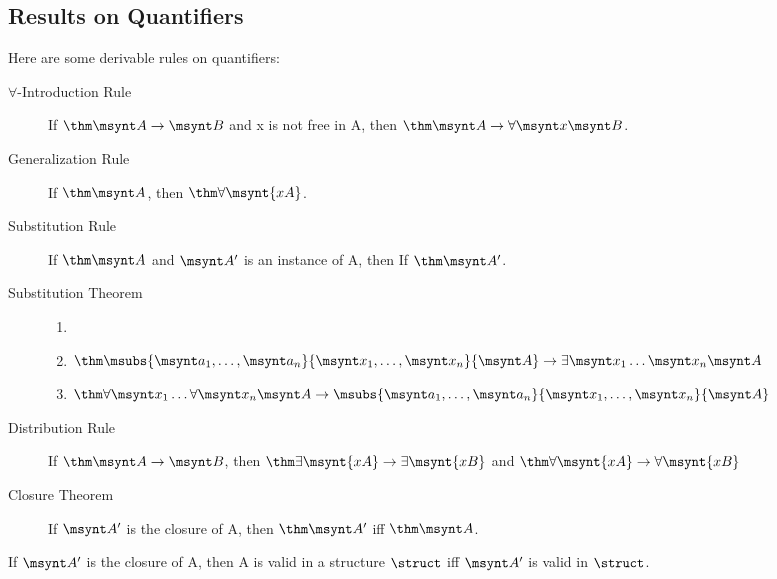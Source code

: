 \subsection{Results on Quantifiers}

\begin{fact}
	Here are some derivable rules on quantifiers:
	\begin{description}
		\item[$\forall$-Introduction Rule] If $\thm \msynt A \to \msynt B$ and
		\synt x is not free in \synt A, then $\thm \msynt A \to \forall \msynt x \msynt B$.
		\item[Generalization Rule] If $\thm \msynt A$, then $\thm \forall \msynt{xA}$.
		\item[Substitution Rule] If $\thm \msynt A$ and $\msynt A'$ is an instance
		of \synt A, then If $\thm \msynt A'$.
		\item[Substitution Theorem] 
		\begin{enumerate}
			\item[]
			\item $\thm \msubs{\msynt a_1,\dots,\msynt a_n}{\msynt x_1,\dots,\msynt x_n}{\msynt A}\to
			\exists \msynt x_1\dots\msynt x_n\msynt A$
			\item $\thm \forall \msynt x_1\dots\forall\msynt x_n\msynt A\to
			\msubs{\msynt a_1,\dots,\msynt a_n}{\msynt x_1,\dots,\msynt x_n}{\msynt A}$	
		\end{enumerate}
		\item[Distribution Rule] If $\thm \msynt A \to \msynt B$, then
		$\thm \exists \msynt{xA}\to\exists\msynt{xB}$ and
		$\thm \forall \msynt{xA}\to\forall\msynt{xB}$
		\item[Closure Theorem] If $\msynt A'$ is the closure of \synt A, then 
		$\thm \msynt A'$ iff $\thm \msynt A$.
	\end{description}
\end{fact}

\begin{corollary}
	If $\msynt A'$ is the closure of \synt A, then \synt A is valid in a
	structure $\struct$ iff $\msynt A'$ is valid in $\struct$.
\end{corollary}